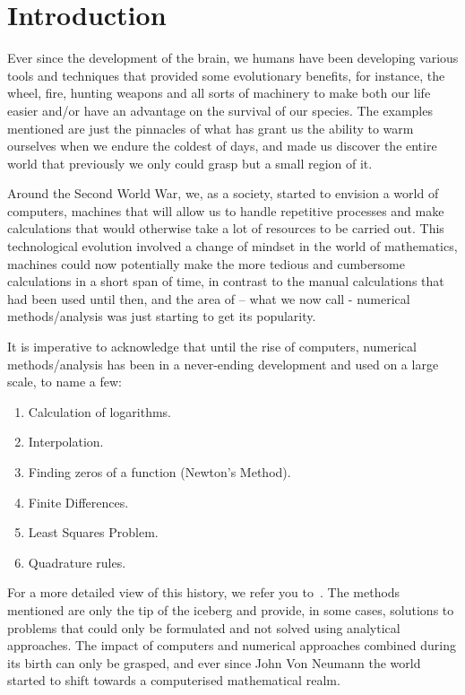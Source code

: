 \chapter{Introduction}

Ever since the development of the brain, we humans have been developing various tools and techniques that provided some evolutionary benefits, for instance, the wheel, fire, hunting weapons and all sorts of machinery to make both our life easier and/or have an advantage on the survival of our species. The examples mentioned are just the pinnacles of what has grant us the ability to warm ourselves when we endure the coldest of days, and made us discover the entire world that previously we only could grasp but a small region of it.

Around the Second World War, we, as a society, started to envision a world of computers, machines that will allow us to handle repetitive processes and make calculations that would otherwise take a lot of resources to be carried out. This technological evolution involved a change of mindset in the world of mathematics, machines could now potentially make the more tedious and cumbersome calculations in a short span of time, in contrast to the manual calculations that had been used until then, and the area of – what we now call - numerical methods/analysis was just starting to get its popularity.

It is imperative to acknowledge that until the rise of computers, numerical methods/analysis has been in a never-ending development and used on a large scale, to name a few:
\begin{enumerate}
    \item Calculation of logarithms.
    \item Interpolation.
    \item Finding zeros of a function (Newton's Method).
    \item Finite Differences.
    \item Least Squares Problem.
    \item Quadrature rules.
\end{enumerate}

For a more detailed view of this history, we refer you to~\cite{goldstine2012history}. The methods mentioned are only the tip of the iceberg and provide, in some cases, solutions to problems that could only be formulated and not solved using analytical approaches. 
The impact of computers and numerical approaches combined during its birth can only be grasped, and ever since John Von Neumann the world started to shift towards a computerised mathematical realm. 

